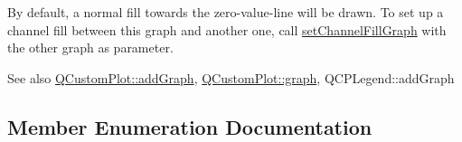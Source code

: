 By default, a normal fill towards the zero-\/value-\/line will be drawn. To set up a channel fill between this graph and another one, call \hyperlink{class_q_c_p_graph_a2d03156df1b64037a2e36cfa50351ca3}{set\+Channel\+Fill\+Graph} with the other graph as parameter.

\begin{DoxySeeAlso}{See also}
\hyperlink{class_q_custom_plot_a6fb2873d35a8a8089842d81a70a54167}{Q\+Custom\+Plot\+::add\+Graph}, \hyperlink{class_q_custom_plot_a6d3ed93c2bf46ab7fa670d66be4cddaf}{Q\+Custom\+Plot\+::graph}, Q\+C\+P\+Legend\+::add\+Graph 
\end{DoxySeeAlso}


\subsection{Member Enumeration Documentation}
\hypertarget{class_q_c_p_graph_ad23b514404bd2cb3216f57c90904d6af}{}
